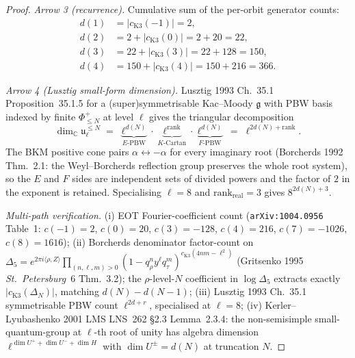 \begin{proof}
\emph{Arrow 3 (recurrence).} Cumulative sum of the per-orbit generator
counts:
\begin{align*}
 d(1) &= |c_{\mathrm{K3}}(-1)| = 2,\\
 d(2) &= 2 + |c_{\mathrm{K3}}(0)| = 2 + 20 = 22,\\
 d(3) &= 22 + |c_{\mathrm{K3}}(3)| = 22 + 128 = 150,\\
 d(4) &= 150 + |c_{\mathrm{K3}}(4)| = 150 + 216 = 366.
\end{align*}

\emph{Arrow 4 (Lusztig small-form dimension).}
Lusztig 1993 Ch.~35.1 Proposition~35.1.5 for a (super)symmetrisable
Kac--Moody $\mathfrak g$ with PBW basis indexed by finite
$\Phi^+_{\le N}$ at level $\ell$ gives the triangular decomposition
\[
 \dim_{\mathbb C}\mathfrak u_\ell^{\leq N}
 \;=\;
 \underbrace{\ell^{d(N)}}_{E\text{-PBW}}
 \cdot
 \underbrace{\ell^{\mathrm{rank}}}_{K\text{-Cartan}}
 \cdot
 \underbrace{\ell^{d(N)}}_{F\text{-PBW}}
 \;=\;
 \ell^{2d(N) + \mathrm{rank}}.
\]
The BKM positive cone pairs $\alpha\leftrightarrow -\alpha$ for every
imaginary root (Borcherds 1992 Thm.~2.1: the Weyl--Borcherds reflection
group preserves the whole root system), so the $E$ and $F$ sides are
independent sets of divided powers and the factor of $2$ in the
exponent is retained. Specialising $\ell = 8$ and
$\mathrm{rank}_{\mathrm{real}} = 3$ gives
$8^{2d(N)+3}$.

\emph{Multi-path verification.}
(i) EOT Fourier-coefficient count
 (\texttt{arXiv:1004.0956} Table~1: $c(-1){=}2$, $c(0){=}20$,
 $c(3){=}{-}128$, $c(4){=}216$, $c(7){=}{-}1026$, $c(8){=}1616$);
(ii) Borcherds denominator factor-count on
 $\Delta_5 = e^{2\pi i\langle\rho,Z\rangle}
 \prod_{(n,\ell,m)>0}(1-q_\rho^n y^\ell q_\tau^m)^{c_{\mathrm K3}(4nm-\ell^2)}$
 (Gritsenko 1995 \emph{St.~Petersburg}~6 Thm.~3.2); the
 $\rho$-level-$N$ coefficient in $\log\Delta_5$ extracts exactly
 $|c_{\mathrm K3}(\Delta_N)|$, matching $d(N) - d(N-1)$;
(iii) Lusztig 1993 Ch.~35.1 symmetrisable PBW count
 $\ell^{2d+r}$, specialised at $\ell = 8$;
(iv) Kerler--Lyubashenko 2001 LMS LNS~262 \S2.3 Lemma~2.3.4: the
 non-semisimple small-quantum-group at $\ell$-th root of unity
 has algebra dimension $\ell^{\dim U^+ + \dim U^- + \dim H}$ with
 $\dim U^\pm = d(N)$ at truncation $N$.
\end{proof}

